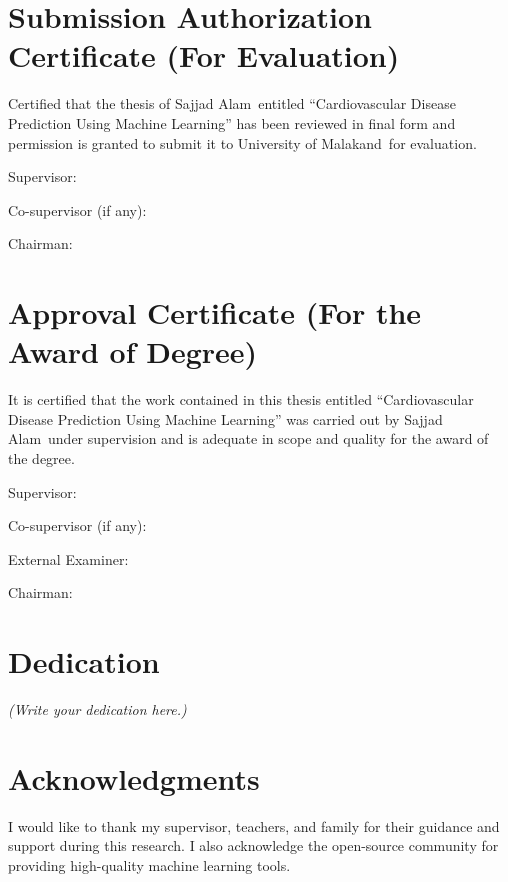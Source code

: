 \documentclass[12pt, a4paper, oneside]{book}
\newcommand{\thesistitle}{Cardiovascular Disease Prediction Using Machine Learning}
\newcommand{\thesisauthor}{Sajjad Alam}
\newcommand{\thesisuni}{University of Malakand}
\begin{document}
\chapter*{Submission Authorization Certificate (For Evaluation)}
Certified that the thesis of \thesisauthor\ entitled ``\thesistitle'' has been reviewed in final form and permission is granted to submit it to \thesisuni\ for evaluation.
\par\bigskip
Supervisor:\dotfill\par
Co-supervisor (if any):\dotfill\par
Chairman:\dotfill

\chapter*{Approval Certificate (For the Award of Degree)}
It is certified that the work contained in this thesis entitled ``\thesistitle'' was carried out by \thesisauthor\ under supervision and is adequate in scope and quality for the award of the degree.
\par\bigskip
Supervisor:\dotfill\par
Co-supervisor (if any):\dotfill\par
External Examiner:\dotfill\par
Chairman:\dotfill

\chapter*{Dedication}
\begin{center}
\emph{(Write your dedication here.)}
\end{center}

\chapter*{Acknowledgments}
I would like to thank my supervisor, teachers, and family for their guidance and support during this research. I also acknowledge the open-source community for providing high-quality machine learning tools.

\tableofcontents
\listoffigures
\listoftables
\end{document}
